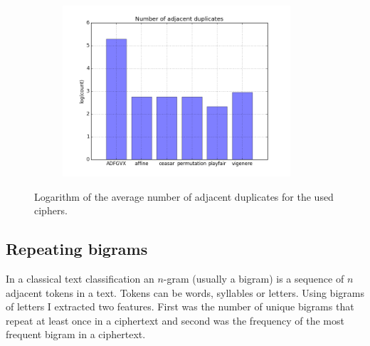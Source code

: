 \documentclass[a4paper]{article}
\begin{document}
\begin{figure}[H]
    \centering
    \begin{subfigure}[h]{0.5\textwidth}
        \centering
        \includegraphics[height=2.5in]{img/no_adj_dups_log.png}
    \end{subfigure}
    \caption{Logarithm of the average number of adjacent duplicates for the used ciphers.}
    \label{fig:adj_dups}
\end{figure}

\subsection{Repeating bigrams}
In a classical text classification an $n$-gram (usually a bigram) is a sequence of $n$ adjacent tokens in a text. Tokens can be words, syllables or letters. Using bigrams of letters I extracted two features. First was the number of unique bigrams that repeat at least once in a ciphertext and second was the frequency of the most frequent bigram in a ciphertext.
\end{document}
